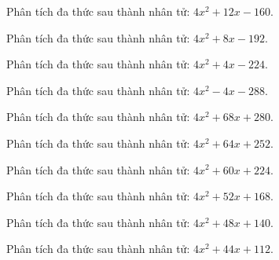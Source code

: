 \begin{bt}
	Phân tích đa thức sau thành nhân tử: $4 x^2 + 12 x - 160$.
\end{bt}
\begin{bt}
	Phân tích đa thức sau thành nhân tử: $4 x^2 + 8 x - 192$.
\end{bt}
\begin{bt}
	Phân tích đa thức sau thành nhân tử: $4 x^2 + 4 x - 224$.
\end{bt}
\begin{bt}
	Phân tích đa thức sau thành nhân tử: $4 x^2 - 4 x - 288$.
\end{bt}
\begin{bt}
	Phân tích đa thức sau thành nhân tử: $4 x^2 + 68 x + 280$.
\end{bt}
\begin{bt}
	Phân tích đa thức sau thành nhân tử: $4 x^2 + 64 x + 252$.
\end{bt}
\begin{bt}
	Phân tích đa thức sau thành nhân tử: $4 x^2 + 60 x + 224$.
\end{bt}
\begin{bt}
	Phân tích đa thức sau thành nhân tử: $4 x^2 + 52 x + 168$.
\end{bt}
\begin{bt}
	Phân tích đa thức sau thành nhân tử: $4 x^2 + 48 x + 140$.
\end{bt}
\begin{bt}
	Phân tích đa thức sau thành nhân tử: $4 x^2 + 44 x + 112$.
\end{bt}
